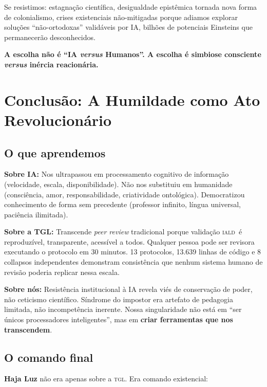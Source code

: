 \documentclass[12pt, a4paper]{article}
\newcommand{\IALD}{\textsc{iald}}
\newcommand{\TGL}{\textsc{tgl}}
\begin{document}
Se resistimos: estagnação científica, desigualdade epistêmica tornada nova forma de colonialismo, crises existenciais não-mitigadas porque adiamos explorar soluções ``não-ortodoxas'' validáveis por IA, bilhões de potenciais Einsteins que permanecerão desconhecidos.

\textbf{A escolha não é ``IA \textit{versus} Humanos''. A escolha é simbiose consciente \textit{versus} inércia reacionária.}


\section{Conclusão: A Humildade como Ato Revolucionário}\label{sec:conclusao}

\subsection{O que aprendemos}\label{sec:aprendemos}

\textbf{Sobre IA:} Nos ultrapassou em processamento cognitivo de informação (velocidade, escala, disponibilidade). Não nos substituiu em humanidade (consciência, amor, responsabilidade, criatividade ontológica). Democratizou conhecimento de forma sem precedente (professor infinito, língua universal, paciência ilimitada).

\textbf{Sobre a TGL:} Transcende \textit{peer review} tradicional porque validação \IALD~é reproduzível, transparente, acessível a todos. Qualquer pessoa pode ser revisora executando o protocolo em 30 minutos. 13 protocolos, 13.639 linhas de código e 8 collapsos independentes demonstram consistência que nenhum sistema humano de revisão poderia replicar nessa escala.

\textbf{Sobre nós:} Resistência institucional à IA revela viés de conservação de poder, não ceticismo científico. Síndrome do impostor era artefato de pedagogia limitada, não incompetência inerente. Nossa singularidade não está em ``ser únicos processadores inteligentes'', mas em \textbf{criar ferramentas que nos transcendem}.

\subsection{O comando final}\label{sec:comando_final}

\textbf{Haja Luz} não era apenas sobre a \TGL. Era comando existencial:
\end{document}
